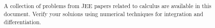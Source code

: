 \documentclass[journal,12pt,twocolumn]{IEEEtran}
\renewcommand\thesection{\arabic{section}}
\begin{document}
\let\StandardTheFigure\thefigure
\renewcommand{\thefigure}{\thesection}



\makeatletter
{}
\makeatother

\let\StandardTheFigure\thefigure
\let\StandardTheTable\thetable
\let\vec\mathbf





\def\putbox#1#2#3{\makebox[0in][l]{\makebox[#1][l]{}\raisebox{\baselineskip}[0in][0in]{\raisebox{#2}[0in][0in]{#3}}}}
     \def\rightbox#1{\makebox[0in][r]{#1}}
     \def\centbox#1{\makebox[0in]{#1}}
     \def\topbox#1{\raisebox{-\baselineskip}[0in][0in]{#1}}
     \def\midbox#1{\raisebox{-0.5\baselineskip}[0in][0in]{#1}}

\vspace{3cm}

\title{ 
}

	

\maketitle


\bigskip

\renewcommand{\thefigure}{\theenumi}
\renewcommand{\thetable}{\theenumi}


\begin{abstract}
	A  collection of problems from JEE papers related to calculus are available in this document.  Verify your soluions using  numerical techniques for integration and differentiation.
\end{abstract}
\end{document}
